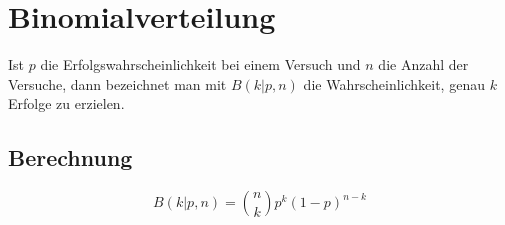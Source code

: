 \documentclass[14pt]{article}
\begin{document}
\section{Binomialverteilung}
    \begin{definition}[Binomialverteilung]
        Ist $p$ die Erfolgswahrscheinlichkeit bei einem Versuch und $n$
        die Anzahl der Versuche, dann bezeichnet man mit $B(k | p, n)$
        die Wahrscheinlichkeit, genau $k$ Erfolge zu erzielen.
    \end{definition}
        
    \subsection{Berechnung}
        \[
            B(k | p, n) = \binom{n}{k} p^k (1 - p)^{n - k} 
        \]
\end{document}
